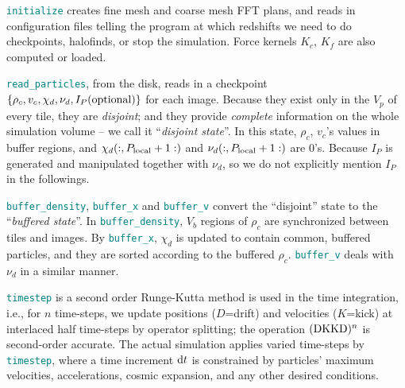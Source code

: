\documentclass[10pt,twocolumn,preprint]{emulateapj}
\newcommand{\tcx}{\textcolor{teal}}
\begin{document}
{\tt \tcx{initialize}} creates fine mesh and coarse mesh FFT plans, and reads in configuration files telling the program at which redshifts we need to do checkpoints, halofinds, or stop the simulation. Force kernels $K_c$, $K_f$ are also computed or loaded.

{\tt \tcx{read\_particles}}, from the disk, reads in a checkpoint $\{\rho_c,v_c,\chi_d,\nu_d,I_P({\rm optional})\}$ for each image. Because they exist only in the $V_p$ of every tile, they are {\it disjoint}; and they provide {\it complete} information on the whole simulation volume -- we call it ``{\it disjoint state}''. In this state, $\rho_c$, $v_c$'s values in buffer regions, and $\chi_d(:,P_{\rm local}+1:)$ and $\nu_d(:,P_{\rm local}+1:)$ are 0's. Because $I_P$ is generated and manipulated together with $\nu_d$, so we do not explicitly mention $I_P$ in the followings.

{\tt \tcx{buffer\_density}}, {\tt \tcx{buffer\_x}} and {\tt \tcx{buffer\_v}} convert the ``disjoint'' state to the ``{\it buffered state}''. In {\tt \tcx{buffer\_density}}, $V_b$ regions of $\rho_c$ are synchronized between tiles and images. By {\tt \tcx{buffer\_x}}, $\chi_d$ is updated to contain common, buffered particles, and they are sorted according to the buffered $\rho_c$. {\tt \tcx{buffer\_v}} deals with $\nu_d$ in a similar manner.

{\tt \tcx{timestep}} is
a second order Runge-Kutta method is used in the time integration, i.e., for $n$ time-steps, we update positions ($D$=drift) and velocities ($K$=kick) at interlaced half time-steps by operator splitting; the operation $({\rm DKKD})^n$ is second-order accurate. The actual simulation applies varied time-steps by {\tt \tcx{timestep}}, where a time increment ${\rm d}t$ is constrained by particles' maximum velocities, accelerations, cosmic expansion, and any other desired conditions.
\end{document}
